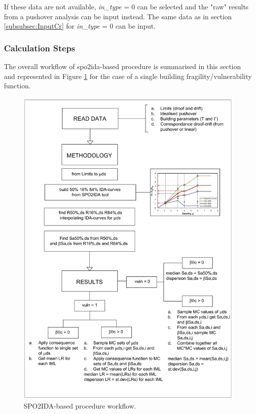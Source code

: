 If these data are not available, \textit{in\_type} = 0 can be selected and the "raw" results from a pushover analysis can be input instead. The same data as in section \ref{subsubsec:InputCr} for \textit{in\_type} = 0 can be input.

\subsubsection{Calculation Steps}
The overall workflow of spo2ida-based procedure is summarised in this section and represented in Figure \ref{fig:SPO_workflow} for the case of a single building fragility/vulnerability function. 

\begin{figure}[!htbp]
\centering
\includegraphics[width=15cm]{./figures/spo-WorkFlow.jpg}
\caption{SPO2IDA-based procedure workflow.}
\label{fig:SPO_workflow}
\end{figure}

